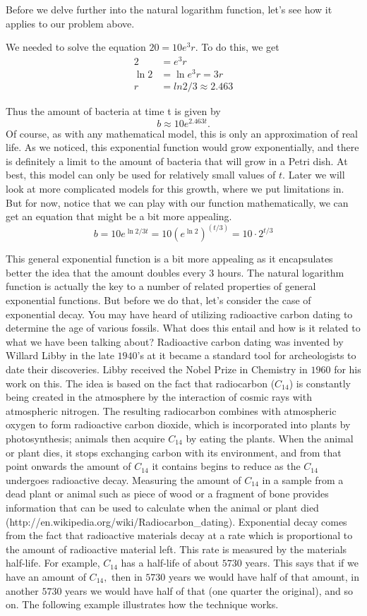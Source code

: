 Before we delve further into the natural logarithm function, let’s see
how it applies to our problem above. 

We needed to solve the equation $20=10e^3r.$  To do this, we get
\begin{align*}
2&=e^3r\\
\ln 2&=\ln e^3r =3r\\
r&=ln2/3≈2.463
\end{align*}

Thus the amount of bacteria at time t is given by 
$$
b≈10e^{2.463t}.
$$
Of course, as with any mathematical model, this is only an
approximation of real life.  As we noticed, this exponential function
would grow exponentially, and there is definitely a limit to the
amount of bacteria that will grow in a Petri dish.  At best, this
model can only be used for relatively small values of $t.$  Later we
will look at more complicated models for this growth, where we put
limitations in.  But for now, notice that we can play with our
function mathematically, we can get an equation that might be a bit
more appealing.
$$
b=10e^{\ln2/3 t}=10\left(e^{\ln 2}\right)^(t/3)=10\cdot2^{t/3}
$$

This general exponential function is a bit more appealing as it
encapsulates better the idea that the amount doubles every $3$ hours.
The natural logarithm function is actually the key to a number of
related properties of general exponential functions.  But before we do
that, let’s consider the case of exponential decay.  You may have
heard of utilizing radioactive carbon dating to determine the age of
various fossils.  What does this entail and how is it related to what
we have been talking about?  Radioactive carbon dating was invented by
Willard Libby in the late $1940$’s at it became a standard tool for
archeologists to date their discoveries.  Libby received the Nobel
Prize in Chemistry in $1960$ for his work on this.  The idea is based on
the fact that radiocarbon ($C_{14}$) is constantly being created in the
atmosphere by the interaction of cosmic rays with atmospheric
nitrogen. The resulting radiocarbon combines with atmospheric oxygen
to form radioactive carbon dioxide, which is incorporated into plants
by photosynthesis; animals then acquire $C_{14}$ by eating the plants. When
the animal or plant dies, it stops exchanging carbon with its
environment, and from that point onwards the amount of $C_{14}$ it contains
begins to reduce as the $C_{14}$ undergoes radioactive decay. Measuring the
amount of $C_{14}$ in a sample from a dead plant or animal such as piece of
wood or a fragment of bone provides information that can be used to
calculate when the animal or plant died 
(http://en.wikipedia.org/wiki/Radiocarbon\_dating).  Exponential decay
comes from the fact that radioactive materials decay at a rate which
is proportional to the amount of radioactive material left.  This rate
is measured by the materials half-life.  For example, $C_{14}$ has a
half-life of about $5730$ years.  This says that if we have an amount of
$C_{14},$ then in $5730$ years we would have half of that amount, in another
$5730$ years we would have half of that (one quarter the original), and
so on.  The following example illustrates how the technique works.

